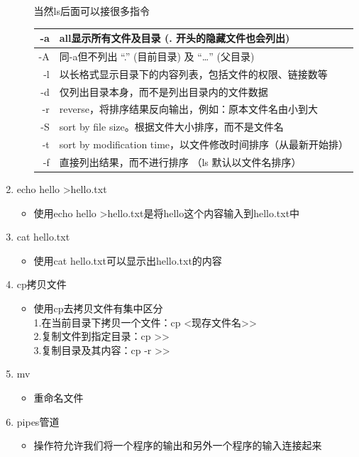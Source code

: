 \documentclass[a4paper, 12pt]{article}
\begin{document}
\begin{enumerate}
\begin{itemize}
            当然ls后面可以接很多指令\\
      \begin{tabular}{|r|l|}
        \hline
        -a   & all显示所有文件及目录 (. 开头的隐藏文件也会列出)  \\
        \hline 
        -A   & 同-a但不列出 “.” (目前目录) 及 “…” (父目录)  \\
        \hline 
        -l   & 以长格式显示目录下的内容列表，包括文件的权限、链接数等  \\
        \hline 
        -d   & 仅列出目录本身，而不是列出目录内的文件数据  \\
        \hline 
        -r   & reverse，将排序结果反向输出，例如：原本文件名由小到大  \\
        \hline 
        -S   & sort by file size。根据文件大小排序，而不是文件名  \\
        \hline 
        -t   & sort by modification time，以文件修改时间排序（从最新开始排）  \\
        \hline 
        -f   & 直接列出结果，而不进行排序 （ls 默认以文件名排序）  \\
        \hline 
      \end{tabular}
    \end{itemize}
  \item{\large echo hello \textgreater  hello.txt}
    \begin{itemize}
      \item 使用echo hello \textgreater  hello.txt是将hello这个内容输入到hello.txt中
    \end{itemize}
  \item{\large cat hello.txt}
    \begin{itemize}
      \item 使用cat hello.txt可以显示出hello.txt的内容
    \end{itemize}
  \item{\large cp拷贝文件}
    \begin{itemize}
      \item 使用cp去拷贝文件有集中区分\\
      1.在当前目录下拷贝一个文件：cp \textless 现存文件名\textgreater {}\textgreater  \\
      2.复制文件到指定目录：cp \textgreater {}\textgreater \\
      3.复制目录及其内容：cp -r \textgreater {}\textgreater  \\
    \end{itemize}
  \item{\large mv}
    \begin{itemize}
      \item 重命名文件
    \end{itemize}
  \item{\large pipes管道}
    \begin{itemize}
      \item \textbar  操作符允许我们将一个程序的输出和另外一个程序的输入连接起来
    \end{itemize}
\end{enumerate}
\end{document}
